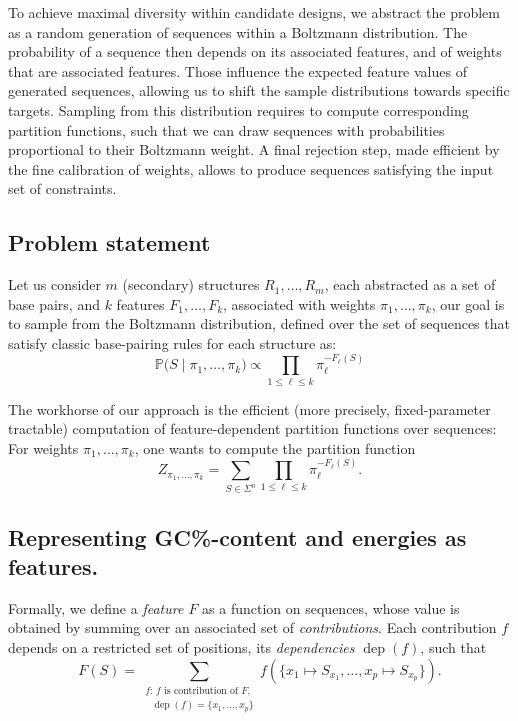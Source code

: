 \documentclass[twocolumn]{bmcart}%
\newcommand{\dep}{\operatorname{dep}}
\newcommand{\partfun}[1]{Z_{#1}}
\newcommand{\Def}[1]{\emph{#1}}
\newcommand{\Nuc}[1]{{\sf #1}}
\newcommand{\Cb}{\Nuc{C}}
\newcommand{\Gb}{\Nuc{G}}
\newcommand{\GCb}{\Gb\Cb}
\renewcommand{\Pr}[1]{\mathbb{P}{#1}}
\begin{document}
To achieve maximal diversity within candidate designs, we abstract the problem as a random generation of sequences within a Boltzmann distribution. The probability of a sequence then depends on its associated features, and of weights that are associated features. Those influence the expected feature values of generated sequences, allowing us to shift the sample distributions towards specific targets. Sampling from this distribution requires to compute corresponding partition functions, such that we can draw sequences with probabilities proportional to their Boltzmann weight. A final rejection step, made efficient by the fine calibration of weights, allows to produce sequences satisfying the input set of constraints.
 
\subsection*{Problem statement}
\label{sec:problem-statement}
Let us consider $m$ (secondary) structures $R_1,\dots, R_m$, each abstracted as a set of base pairs, and $k$ features $F_1,\dots, F_k$, associated with weights $\pi_1,\dots,\pi_k$, our goal is to sample from the Boltzmann distribution, defined over the set of sequences that satisfy classic base-pairing rules for each structure as: 
\begin{equation}
\label{eq:sample-distribution}
\Pr(S\mid\pi_1,\dots,\pi_k) \propto \displaystyle\prod_{1\leq \ell\leq k}\!\! \pi_\ell^{-F_\ell(S)} \end{equation}

The workhorse of our approach is the efficient (more precisely, fixed-parameter tractable) computation of feature-dependent partition functions over sequences:
For weights $\pi_1,\dots,\pi_k$, one wants to compute the partition function
  \begin{equation}
    \label{eq:mainproblem}
    \partfun{\pi_1,\dots,\pi_k} = \sum_{S\in\Sigma^n} \prod_{1\leq \ell\leq k} \pi_\ell^{-F_\ell(S)}.
  \end{equation}

\subsection*{Representing \GCb\%-content and energies as features.}
Formally, we define a \Def{feature $F$} as a function on sequences, whose value is obtained by summing over an associated set of \Def{contributions}. Each contribution $f$ depends on a restricted set of positions, its \emph{dependencies $\dep(f)$}, such that
$$
F(S) =\!\!\!\!\!\!\!\sum_{\substack{\text{$f$: $f$ is contribution of $F$,}\\\text{ $\dep(f)=\{x_1,\ldots,x_p\}$}}}\!\!\!\!\!\!\! f(\{x_1\mapsto S_{x_1},\ldots,x_p\mapsto S_{x_p}\}).
$$
\end{document}
